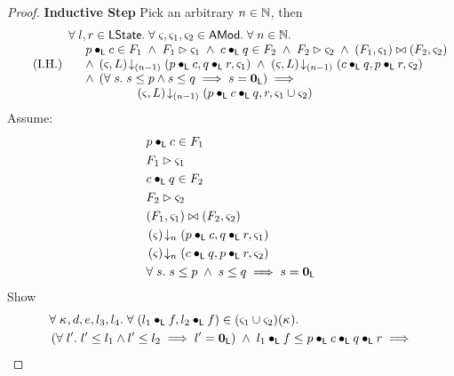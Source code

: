 \begin{lemma}[]
\begin{proof}
\noindent
\textbf{}
\textbf{Inductive Step} Pick an arbitrary $n \in \mathbb{N}$, then
%
\begin{equation}
	\tag{I.H.}
	\begin{array}{l}
		\forall\; l, r \in \textsf{LState}.\; \forall\; \varsigma_{}, \varsigma_{1}, \varsigma_{2} \in \textsf{AMod}.\; \forall\; n \in \mathbb{N}.\;\\
		\hspace*{0.5cm} p \bullet_{\textsf{L}} c \in F_1 \;\land\; F_1 \rhd \varsigma_{1} \;\land\; c \bullet_{\textsf{L}} q \in F_2 \;\land\; F_2 \rhd \varsigma_{2} \;\land\; (F_1, \varsigma_{1}) \bowtie (F_2, \varsigma_{2})\\
		\hspace*{0.5cm} \land\; \left(\varsigma_{}, L\right) \!\downarrow_{(n-1)} \left(p \bullet_{\textsf{L}} c, q \bullet_{\textsf{L}} r, \varsigma_{1}\right) \;\land\; \left(\varsigma_{}, L\right) \!\downarrow_{(n-1)} \left(c \bullet_{\textsf{L}} q, p \bullet_{\textsf{L}} r, \varsigma_{2}\right)\\
		\hspace*{0.5cm}\land\;\left( \forall\; s.\; s \leq p \land s \leq q \implies s = \mathbf{0}_{\textsf{L}} \right)
		\implies\\
		\hspace*{2cm} \left(\varsigma_{}, L\right) \!\downarrow_{(n-1)} \left(p \bullet_{\textsf{L}} c \bullet_{\textsf{L}} q, r, \varsigma_{1} \cup \varsigma_{2}\right)
	\end{array}
\label{LM:I.H}
\end{equation}
%
Assume:
%
\begin{align}
	& p \bullet_{\textsf{L}} c \in F_1 \label{LM:Ass1}\\
	& F_1 \rhd \varsigma_{1} \label{LM:Ass2}\\
	& c \bullet_{\textsf{L}} q \in F_2 \label{LM:Ass3}\\
	& F_2 \rhd \varsigma_{2} \label{LM:Ass4}\\
	& (F_1, \varsigma_{1}) \bowtie (F_2, \varsigma_{2}) \label{LM:Ass5}\\
	& \left(\varsigma_{}\right) \!\downarrow_{n} \left(p \bullet_{\textsf{L}} c, q \bullet_{\textsf{L}} r, \varsigma_{1}\right) \label{LM:Ass6}\\
	& \left(\varsigma_{}\right) \!\downarrow_{n} \left(c \bullet_{\textsf{L}} q, p \bullet_{\textsf{L}} r, \varsigma_{2}\right) \label{LM:Ass7}\\
	& \forall\; s.\; s \leq p \;\land\; s \leq q \implies s = \mathbf{0}_{\textsf{L}} \label{LM:Ass0}
\end{align}
%
Show
%
\begin{align}
	&\for{\ca{}, d, e, l_3, l_4}\for{(l_1 \composeL f, l_2 \composeL f) \in (\amod{1} \cup \amod{2})(\ca{})} \nonumber\\
	& \left(\for{l'} l' \leq l_1 \land l' \leq l_2 \implies l' = \unitL\right) \;\land\; l_1 \composeL f \leq  p \composeL c \composeL q \composeL r  \implies\nonumber\\

\end{align}
\end{proof}
\end{lemma}
